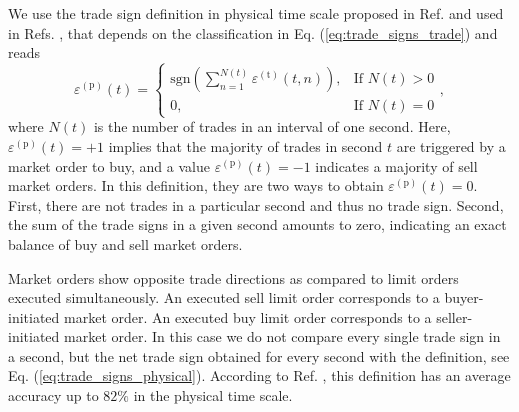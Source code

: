 We use the trade sign definition in physical time scale proposed in Ref.
\cite{Wang_2016_cross} and used in Refs.
\cite{Wang_2016_avg,Wang_2017}, that depends on the classification in
Eq. (\ref{eq:trade_signs_trade}) and reads
\begin{equation}\label{eq:trade_signs_physical}
    \varepsilon^{\left(\textrm{p}\right)}\left(t\right)=\left\{
    \begin{array}{cc}
    \text{sgn}\left(\sum_{n=1}^{N\left(t\right)}
    \varepsilon^{\left(\textrm{t}\right)} \left(t,n\right)\right),
    & \text{If }N \left(t\right)>0\\
    0, & \text{If }N\left(t\right)=0
    \end{array}\right. ,
\end{equation}
where $N \left(t \right)$ is the number of trades in an interval of one second.
Here, $\varepsilon^{\left(\textrm{p}\right)}\left( t \right) = +1$ implies that
the majority of trades in second $t$ are triggered by a market order to buy,
and a value $\varepsilon^{\left(\textrm{p}\right)}\left( t \right) = -1$
indicates a majority of sell market orders. In this definition, they are two
ways to obtain $\varepsilon^{\left(\textrm{p}\right)}\left( t \right) = 0$.
First, there are not trades in a particular second and thus no trade sign.
Second, the sum of the trade signs in a given second amounts to zero,
indicating an exact balance of buy and sell market orders.

Market orders show opposite trade directions as compared to limit orders
executed simultaneously. An executed sell limit order corresponds to a
buyer-initiated market order. An executed buy limit order corresponds to a
seller-initiated market order. In this case we do not compare every single
trade sign in a second, but the net trade sign obtained for every second with
the definition, see Eq. (\ref{eq:trade_signs_physical}). According to Ref.
\cite{Wang_2016_cross}, this definition has an average accuracy up to $82\%$ in
the physical time scale.
